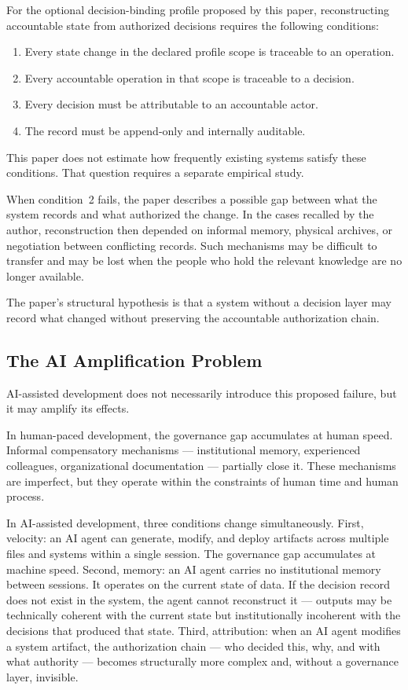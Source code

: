 \documentclass[conference]{IEEEtran}
\begin{document}
For the optional decision-binding profile proposed by this paper, reconstructing
accountable state from authorized decisions requires the following conditions:

\begin{enumerate}
  \item Every state change in the declared profile scope is traceable to an operation.
  \item Every accountable operation in that scope is traceable to a decision.
  \item Every decision must be attributable to an accountable actor.
  \item The record must be append-only and internally auditable.
\end{enumerate}

This paper does not estimate how frequently existing systems satisfy these
conditions. That question requires a separate empirical study.

When condition~2 fails, the paper describes a possible gap between what the
system records and what authorized the change. In the cases recalled by the
author, reconstruction then depended on informal memory, physical archives, or
negotiation between conflicting records. Such mechanisms may be difficult to
transfer and may be lost when the people who hold the relevant knowledge are no
longer available.

The paper's structural hypothesis is that a system without a decision layer may
record what changed without preserving the accountable authorization chain.

\subsection{The AI Amplification Problem}

AI-assisted development does not necessarily introduce this proposed failure,
but it may amplify its effects.

In human-paced development, the governance gap accumulates at human speed. Informal compensatory mechanisms --- institutional memory, experienced colleagues, organizational documentation --- partially close it. These mechanisms are imperfect, but they operate within the constraints of human time and human process.

In AI-assisted development, three conditions change simultaneously. First, velocity: an AI agent can generate, modify, and deploy artifacts across multiple files and systems within a single session. The governance gap accumulates at machine speed. Second, memory: an AI agent carries no institutional memory between sessions. It operates on the current state of data. If the decision record does not exist in the system, the agent cannot reconstruct it --- outputs may be technically coherent with the current state but institutionally incoherent with the decisions that produced that state. Third, attribution: when an AI agent modifies a system artifact, the authorization chain --- who decided this, why, and with what authority --- becomes structurally more complex and, without a governance layer, invisible.
\end{document}
